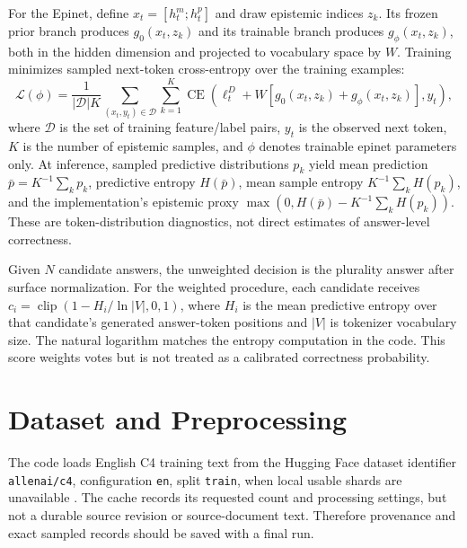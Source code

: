 \documentclass[conference]{IEEEtran}
\begin{document}
For the Epinet, define $x_t=[h^m_t;h^p_t]$ and draw epistemic indices $z_k$. Its frozen prior branch produces $g_0(x_t,z_k)$ and its trainable branch produces $g_\phi(x_t,z_k)$, both in the hidden dimension and projected to vocabulary space by $W$. Training minimizes sampled next-token cross-entropy over the training examples:
\begin{equation}
 \mathcal{L}(\phi)=\frac{1}{|\mathcal{D}|K}\sum_{(x_t,y_t)\in\mathcal{D}}\sum_{k=1}^{K}\operatorname{CE}\left(\ell^D_t+W[g_0(x_t,z_k)+g_\phi(x_t,z_k)],y_t\right),
 \label{eq:loss}
\end{equation}
where $\mathcal{D}$ is the set of training feature/label pairs, $y_t$ is the observed next token, $K$ is the number of epistemic samples, and $\phi$ denotes trainable epinet parameters only. At inference, sampled predictive distributions $p_k$ yield mean prediction $\bar p=K^{-1}\sum_k p_k$, predictive entropy $H(\bar p)$, mean sample entropy $K^{-1}\sum_k H(p_k)$, and the implementation's epistemic proxy $\max(0,H(\bar p)-K^{-1}\sum_k H(p_k))$. These are token-distribution diagnostics, not direct estimates of answer-level correctness.

Given $N$ candidate answers, the unweighted decision is the plurality answer after surface normalization. For the weighted procedure, each candidate receives $c_i=\operatorname{clip}(1-H_i/\ln |V|,0,1)$, where $H_i$ is the mean predictive entropy over that candidate's generated answer-token positions and $|V|$ is tokenizer vocabulary size. The natural logarithm matches the entropy computation in the code. This score weights votes but is not treated as a calibrated correctness probability.

\section{Dataset and Preprocessing}
The code loads English C4 training text from the Hugging Face dataset identifier \texttt{allenai/c4}, configuration \texttt{en}, split \texttt{train}, when local usable shards are unavailable \cite{raffel2020t5}. The cache records its requested count and processing settings, but not a durable source revision or source-document text. Therefore provenance and exact sampled records should be saved with a final run.
\end{document}
